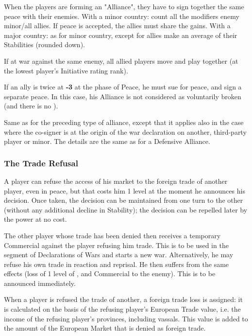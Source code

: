 \bparag When the players are forming an "Alliance", they have to sign together
the same peace with their enemies. With a minor country: count all the
modifiers enemy minor/all allies. If peace is accepted, the allies must share
the gains. With a major country: as for minor country, except for allies make
an average of their Stabilities (rounded down).

\bparag If at war against the same enemy, all allied players move and play
together (at the lowest player's Initiative rating rank).

\bparag If an ally is twice at {\bf -3} \STAB at the phase of Peace, he must
sue for peace, and sign a separate peace. In this case, his Alliance is not
considered as voluntarily broken (and there is no \CB).

\label{chDiplo:Alliance:Offensive Alliance}
Same as for the preceding type of alliance, except that it applies also in the
case where the co-signer is at the origin of the war declaration on another,
third-party player or minor.
\bparag The details are the same as for a Defensive Alliance.


\subsubsection{The Trade Refusal}
\aparag A player can refuse the access of his market to the foreign trade of
another player, even in peace, but that costs him 1 \STAB level at the moment
he announces his decision. Once taken, the decision can be maintained from one
turn to the other (without any additional decline in Stability); the decision
can be repelled later by the power at no cost.

\bparag The other player whose trade has been denied then receives a temporary
Commercial \CB against the player refusing him trade. This \CB is to be used
in the segment of Declarations of Wars and starts a new war.
\bparag Alternatively, he may refuse his own trade in reaction and
reprisal. He then suffers from the same effects (loss of 1 level of \STAB, and
Commercial \CB to the enemy). This is to be announced immediately.


\bparag When a player is refused the trade of another, a foreign trade loss is
assigned: it is calculated on the basis of the refusing player's European
Trade value, i.e. the income of the refusing player's provinces, including
vassals. This value is added to the amount of the European Market that is
denied as foreign
trade.%

